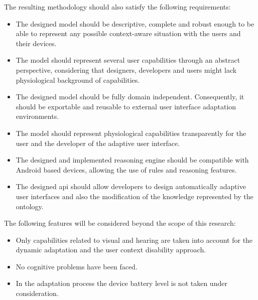 The resulting methodology should also satisfy the following requirements:

\begin{itemize}
  \item The designed model should be descriptive, complete and robust enough to
  be able to represent any possible context-aware situation with the users and
  their devices.
  
  \item The model should represent several user capabilities through an abstract 
  perspective, considering that designers, developers and users might lack 
  physiological background of capabilities.
  
  \item The designed model should be fully domain independent. Consequently, it
  should be exportable and reusable to external user interface adaptation 
  environments.
  
  \item The model should represent physiological capabilities transparently for
  the user and the developer of the adaptive user interface.
  
  \item The designed and implemented reasoning engine should be compatible with
  Android based devices, allowing the use of rules and reasoning features.
  
  \item The designed \ac{api} should allow developers to design automatically
  adaptive user interfaces and also the modification of the knowledge 
  represented by the ontology.
\end{itemize}

The following features will be considered beyond the scope of this research:

\begin{itemize}
  \item Only capabilities related to visual and hearing are taken into account
  for the dynamic adaptation and the user context disability approach. 
  
  \item No cognitive problems have been faced.
  
  \item In the adaptation process the device battery level is not taken under
  consideration.
\end{itemize}

